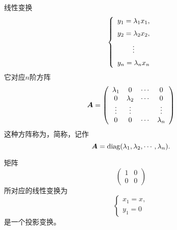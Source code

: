 \begin{frame}
  \begin{footnotesize}
    线性变换
    $$
    \left\{
    \begin{array}{c}
      y_1 = \lambda_1 x_1, \\[0.2cm]
      y_2 = \lambda_2 x_2, \\[0.2cm]
      \vdots \\[0.2cm]
      y_n = \lambda_n x_n
    \end{array}
    \right.
    $$ \pause 
    它对应$n$阶方阵
    $$
    \boldsymbol{A} = \left(
    \begin{array}{cccc}
      \lambda_1& 0    & \cdots  & 0 \\
      0    & \lambda_2    & \cdots  & 0 \\
      \vdots  & \vdots  &      & \vdots \\
      0    & 0    & \cdots  & \lambda_n
    \end{array}
    \right)
    $$
    \pause 这种方阵称为，简称，记作
    $$
    \boldsymbol{A} = \mathrm{diag}(\lambda_1,\lambda_2,\cdots,\lambda_n).
    $$
  \end{footnotesize}
\end{frame}


\begin{frame}
  \begin{footnotesize}
    矩阵
    $$
    \left(
    \begin{array}{cc}
      1 & 0 \\
      0 & 0 
    \end{array}
    \right)
    $$ \pause 
    所对应的线性变换为
    $$
    \left\{
    \begin{array}{l}
      x_1 = x, \\[0.2cm]
      y_1 = 0
    \end{array}
    \right.
    $$
    是一个投影变换。 \pause 
  \end{footnotesize}

  \begin{center}
  \end{center}
\end{frame}




